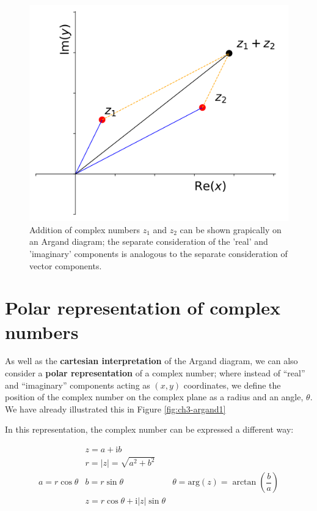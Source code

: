 \documentclass[
]{book}
\begin{document}
\begin{figure}

{\centering \includegraphics[width=0.7\linewidth]{visualisations/ch3-complexnumbers2} 

}

\caption{Addition of complex numbers $z_1$ and $z_2$ can be shown grapically on an Argand diagram; the separate consideration of the 'real' and 'imaginary' components is analogous to the separate consideration of vector components.}\label{fig:ch3-argandcomplexaddition1}
\end{figure}

\hypertarget{sec:ch3-polarcomplexnumbers}{%
\section{Polar representation of complex numbers}\label{sec:ch3-polarcomplexnumbers}}

As well as the \textbf{cartesian interpretation} of the Argand diagram, we can also consider a \textbf{polar representation} of a complex number; where instead of ``real'' and ``imaginary'' components acting as \((x,y)\) coordinates, we define the position of the complex number on the complex plane as a radius and an angle, \(\theta\). We have already illustrated this in Figure \ref{fig:ch3-argand1}

In this representation, the complex number can be expressed a different way:

\begin{equation}
\begin{array}{rcl}
& z = a + \mathrm{i}b & \\
& r = |z| = \sqrt{a^2 + b^2} & \\
a = r\cos \theta & b = r \sin \theta & \theta = \mathrm{arg} (z) = \arctan \left( \dfrac{b}{a} \right) \\
& z = r \cos \theta + \mathrm{i}|z| \sin \theta &
\end{array}
\end{equation}
\end{document}
